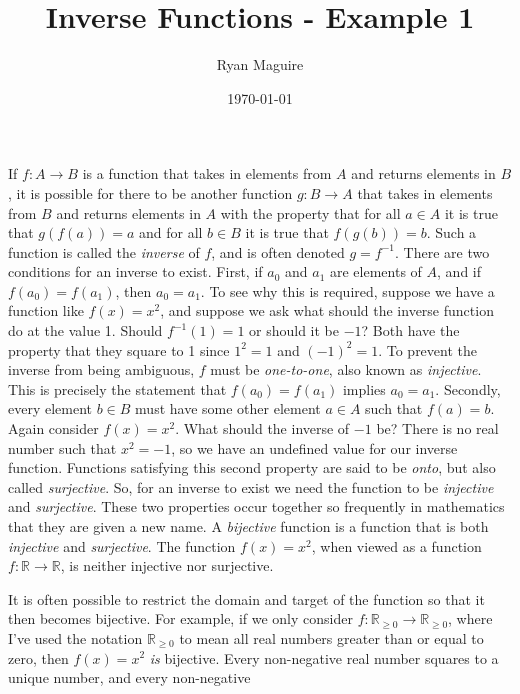 \documentclass{article}
\title{Inverse Functions - Example 1}
\author{Ryan Maguire}
\date{\today}
\begin{document}
    \maketitle
    If $f:A\rightarrow{B}$ is a function that takes in elements from $A$ and
    returns elements in $B$, it is possible for there to be another function
    $g:B\rightarrow{A}$ that takes in elements from $B$ and returns elements
    in $A$ with the property that for all $a\in{A}$ it is true that
    $g(f(a))=a$ and for all $b\in{B}$ it is true that $f(g(b))=b$. Such a
    function is called the \textit{inverse} of $f$, and is often denoted
    $g=f^{-1}$. There are two conditions for an inverse to exist. First,
    if $a_{0}$ and $a_{1}$ are elements of $A$, and if $f(a_{0})=f(a_{1})$,
    then $a_{0}=a_{1}$. To see why this is required, suppose we have a function
    like $f(x)=x^{2}$, and suppose we ask what should the inverse function do
    at the value 1. Should $f^{-1}(1)=1$ or should it be $-1$? Both have the
    property that they square to 1 since $1^{2}=1$ and $(-1)^{2}=1$. To
    prevent the inverse from being ambiguous, $f$ must be
    \textit{one-to-one}, also known as \textit{injective}. This is precisely
    the statement that $f(a_{0})=f(a_{1})$ implies $a_{0}=a_{1}$. Secondly,
    every element $b\in{B}$ must have some other element $a\in{A}$ such that
    $f(a)=b$. Again consider $f(x)=x^{2}$. What should the inverse of $-1$ be?
    There is no real number such that $x^{2}=-1$, so we have an undefined
    value for our inverse function. Functions satisfying this second property
    are said to be \textit{onto}, but also called \textit{surjective}. So, for
    an inverse to exist we need the function to be
    \textit{injective} and \textit{surjective}. These two properties occur
    together so frequently in mathematics that they are given a new name. A
    \textit{bijective} function is a function that is both \textit{injective}
    and \textit{surjective}. The function $f(x)=x^{2}$, when viewed as a
    function $f:\mathbb{R}\rightarrow\mathbb{R}$, is neither injective nor
    surjective.
    \par\hfill\par
    It is often possible to restrict the domain and target of the function
    so that it then becomes bijective. For example, if we only consider
    $f:\mathbb{R}_{\geq{0}}\rightarrow\mathbb{R}_{\geq{0}}$, where I've used
    the notation $\mathbb{R}_{\geq{0}}$ to mean all real numbers greater than
    or equal to zero, then $f(x)=x^{2}$ \textit{is} bijective. Every
    non-negative real number squares to a unique number, and every non-negative
\end{document}
